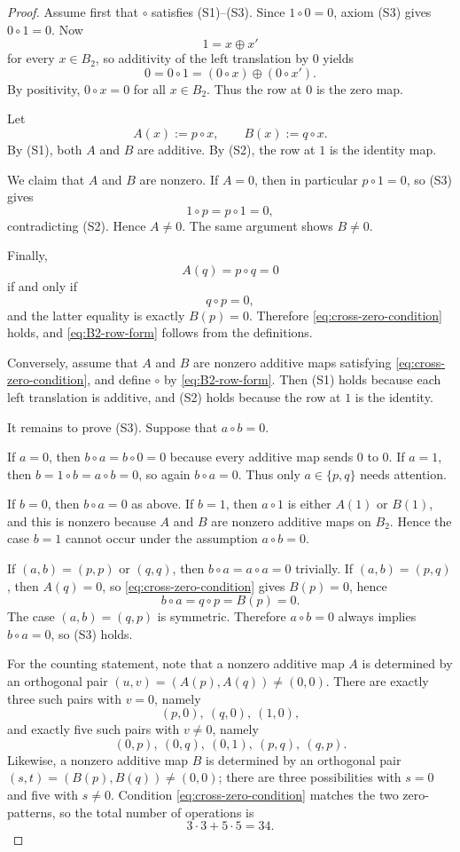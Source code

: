\documentclass[11pt]{article}
\theoremstyle{definition}
\theoremstyle{remark}
\numberwithin{equation}{section}
\newcommand{\op}{\oplus}
\begin{document}
\begin{proof}
Assume first that $\circ$ satisfies \textup{(S1)}--\textup{(S3)}. Since $1\circ 0=0$, axiom \textup{(S3)} gives $0\circ 1=0$. Now
\[
1=x\op x'
\]
for every $x\in B_2$, so additivity of the left translation by $0$ yields
\[
0=0\circ 1=(0\circ x)\op(0\circ x').
\]
By positivity, $0\circ x=0$ for all $x\in B_2$. Thus the row at $0$ is the zero map.

Let
\[
A(x):=p\circ x,
\qquad
B(x):=q\circ x.
\]
By \textup{(S1)}, both $A$ and $B$ are additive. By \textup{(S2)}, the row at $1$ is the identity map.

We claim that $A$ and $B$ are nonzero. If $A=0$, then in particular $p\circ 1=0$, so \textup{(S3)} gives
\[
1\circ p=p\circ 1=0,
\]
contradicting \textup{(S2)}. Hence $A\neq 0$. The same argument shows $B\neq 0$.

Finally,
\[
A(q)=p\circ q=0
\]
if and only if
\[
q\circ p=0,
\]
and the latter equality is exactly $B(p)=0$. Therefore \eqref{eq:cross-zero-condition} holds, and \eqref{eq:B2-row-form} follows from the definitions.

Conversely, assume that $A$ and $B$ are nonzero additive maps satisfying \eqref{eq:cross-zero-condition}, and define $\circ$ by \eqref{eq:B2-row-form}. Then \textup{(S1)} holds because each left translation is additive, and \textup{(S2)} holds because the row at $1$ is the identity.

It remains to prove \textup{(S3)}. Suppose that $a\circ b=0$.

If $a=0$, then $b\circ a=b\circ 0=0$ because every additive map sends $0$ to $0$. If $a=1$, then $b=1\circ b=a\circ b=0$, so again $b\circ a=0$. Thus only $a\in\{p,q\}$ needs attention.

If $b=0$, then $b\circ a=0$ as above. If $b=1$, then $a\circ 1$ is either $A(1)$ or $B(1)$, and this is nonzero because $A$ and $B$ are nonzero additive maps on $B_2$. Hence the case $b=1$ cannot occur under the assumption $a\circ b=0$.

If $(a,b)=(p,p)$ or $(q,q)$, then $b\circ a=a\circ a=0$ trivially. If $(a,b)=(p,q)$, then $A(q)=0$, so \eqref{eq:cross-zero-condition} gives $B(p)=0$, hence
\[
b\circ a=q\circ p=B(p)=0.
\]
The case $(a,b)=(q,p)$ is symmetric. Therefore $a\circ b=0$ always implies $b\circ a=0$, so \textup{(S3)} holds.

For the counting statement, note that a nonzero additive map $A$ is determined by an orthogonal pair $(u,v)=(A(p),A(q))\neq(0,0)$. There are exactly three such pairs with $v=0$, namely
\[
(p,0),\ (q,0),\ (1,0),
\]
and exactly five such pairs with $v\neq 0$, namely
\[
(0,p),\ (0,q),\ (0,1),\ (p,q),\ (q,p).
\]
Likewise, a nonzero additive map $B$ is determined by an orthogonal pair $(s,t)=(B(p),B(q))\neq(0,0)$; there are three possibilities with $s=0$ and five with $s\neq 0$. Condition \eqref{eq:cross-zero-condition} matches the two zero-patterns, so the total number of operations is
\[
3\cdot 3+5\cdot 5=34.
\]
\end{proof}
\end{document}
